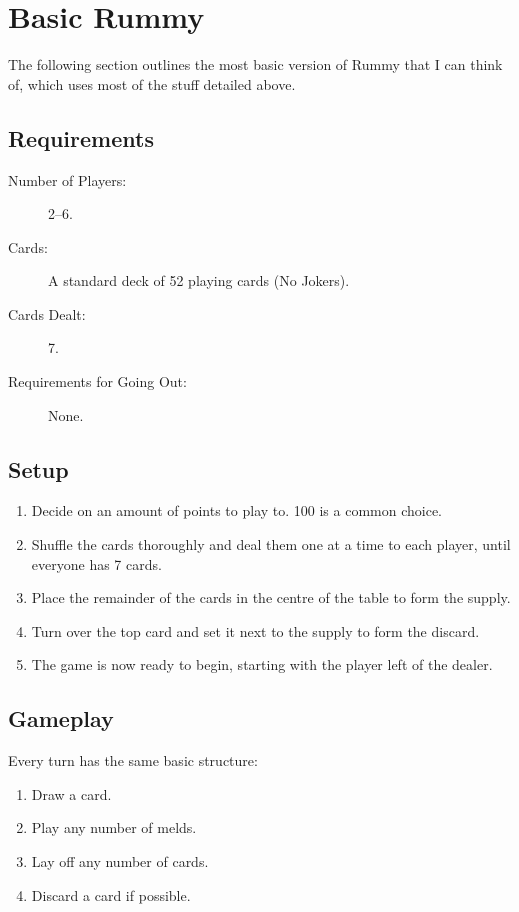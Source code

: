 \newpage\section{Basic Rummy}
The following section outlines the most basic version of Rummy that I can think of, which uses most of the stuff detailed above.

\subsection{Requirements}
\begin{description}
    \item[Number of Players:] 2--6. 
    \item[Cards:] A standard deck of 52 playing cards (No Jokers).
    \item[Cards Dealt:] 7.
    \item[Requirements for Going Out:] None.
\end{description}

\subsection{Setup}
\begin{enumerate}
\item Decide on an amount of points to play to. 100 is a common choice.
\item Shuffle the cards thoroughly and deal them one at a time to each player, until everyone has 7 cards.
\item Place the remainder of the cards in the centre of the table to form the supply.
\item Turn over the top card and set it next to the supply to form the discard.
\item The game is now ready to begin, starting with the player left of the dealer.
\end{enumerate}
\subsection{Gameplay}
Every turn has the same basic structure:
\begin{enumerate}
    \item Draw a card.
    \item Play any number of melds.
    \item Lay off any number of cards.
    \item Discard a card if possible.
\end{enumerate}

